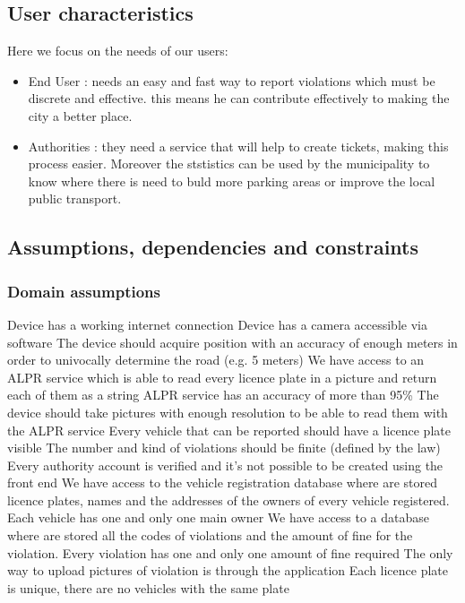 \subsection{User characteristics}
Here we focus on the needs of our users:
\begin{itemize}
  \item End User : needs an easy and fast way to report violations which must be discrete and effective. this means he can contribute effectively to making the city a better place.
  \item Authorities : they need a service that will help to create tickets, making this process easier. Moreover the ststistics can be used by the municipality to know where there is need to buld more parking areas or improve the local public transport.
  \end{itemize}

\subsection{Assumptions, dependencies and constraints}
\subsubsection{Domain assumptions}

\begin{enumerate}
 Device has a working internet connection
 Device has a camera accessible via software
 The device should acquire position with an accuracy of enough meters in order to univocally determine the road (e.g. 5 meters)
 We have access to an ALPR service which is able to read every licence plate in a picture and return each of them as a string
 ALPR service has an accuracy of more than 95\%
 The device should take pictures with enough resolution to be able to read them with the ALPR service
 Every vehicle that can be reported should have a licence plate visible
 The number and kind of violations should be finite (defined by the law)
 Every authority account is verified and it's not possible to be created using the front end
 We have access to the vehicle registration database where are stored licence plates, names and the addresses of the owners of every vehicle registered. Each vehicle has one and only one main owner
 We have access to a database where are stored all the codes of violations and the amount of fine for the violation. Every violation has one and only one amount of fine required
 The only way to upload pictures of violation is through the application
 Each licence plate is unique, there are no vehicles with the same plate

\end{enumerate}

